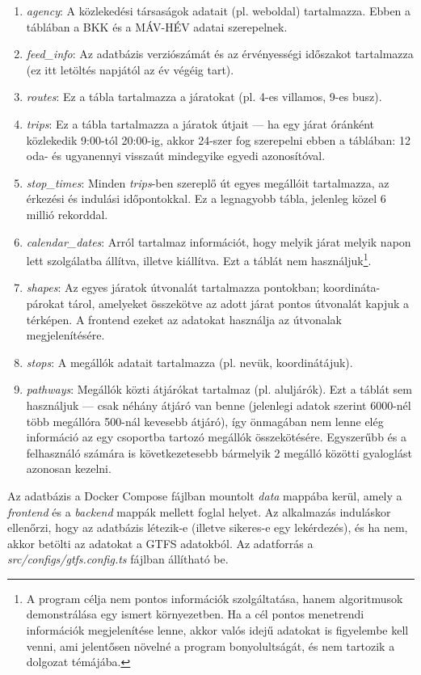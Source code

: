 \begin{enumerate}
    \item \textit{agency}: A közlekedési társaságok adatait (pl. weboldal) tartalmazza. Ebben a táblában a BKK és a MÁV-HÉV adatai szerepelnek.
    \item \textit{feed\_info}: Az adatbázis verziószámát és az érvényességi időszakot tartalmazza (ez itt letöltés napjától az év végéig tart).
    \item \textit{routes}: Ez a tábla tartalmazza a járatokat (pl. 4-es villamos, 9-es busz).
    \item \textit{trips}: Ez a tábla tartalmazza a járatok útjait --- ha egy járat óránként közlekedik 9:00-tól 20:00-ig, akkor 24-szer fog szerepelni ebben a táblában: 12 oda- és ugyanennyi visszaút mindegyike egyedi azonosítóval.
    \item \textit{stop\_times}: Minden \textit{trips}-ben szereplő út egyes megállóit tartalmazza, az érkezési és indulási időpontokkal. Ez a legnagyobb tábla, jelenleg közel 6 millió rekorddal.
    \item \textit{calendar\_dates}: Arról tartalmaz információt, hogy melyik járat melyik napon lett szolgálatba állítva, illetve kiállítva. Ezt a táblát nem használjuk\footnote{A program célja nem pontos információk szolgáltatása, hanem algoritmusok demonstrálása egy ismert környezetben. Ha a cél pontos menetrendi információk megjelenítése lenne, akkor valós idejű adatokat is figyelembe kell venni, ami jelentősen növelné a program bonyolultságát, és nem tartozik a dolgozat témájába.}.
    \item \textit{shapes}: Az egyes járatok útvonalát tartalmazza pontokban; koordináta-párokat tárol, amelyeket összekötve az adott járat pontos útvonalát kapjuk a térképen. A frontend ezeket az adatokat használja az útvonalak megjelenítésére.
    \item \textit{stops}: A megállók adatait tartalmazza (pl. nevük, koordinátájuk).
    \item \textit{pathways}: Megállók közti átjárókat tartalmaz (pl. aluljárók). Ezt a táblát sem használjuk --- csak néhány átjáró van benne (jelenlegi adatok szerint 6000-nél több megállóra 500-nál kevesebb átjáró), így önmagában nem lenne elég információ az egy csoportba tartozó megállók összekötésére. Egyszerűbb és a felhasználó számára is következetesebb bármelyik 2 megálló közötti gyaloglást azonosan kezelni.
\end{enumerate}

Az adatbázis a Docker Compose fájlban mountolt \textit{data} mappába kerül, amely a \textit{frontend} és a \textit{backend} mappák mellett foglal helyet. Az alkalmazás induláskor ellenőrzi, hogy az adatbázis létezik-e (illetve sikeres-e egy lekérdezés), és ha nem, akkor betölti az adatokat a GTFS adatokból. Az adatforrás a \textit{src/configs/gtfs.config.ts} fájlban állítható be.

